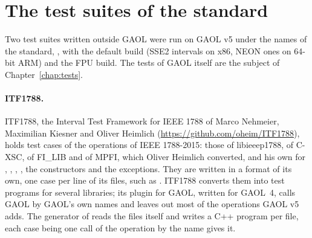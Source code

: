 \documentclass[12pt,a4paper,twoside,openright]{book}
\begin{document}
\section{The test suites of the standard}
\label{sec:test-suites}
%

Two test suites written outside GAOL were run on GAOL v5 under the names of
the standard, , with the default build (SSE2 intervals
on x86, NEON ones on 64-bit ARM) and the FPU build. The tests of GAOL
itself are the subject of Chapter~\ref{chap:tests}.

\paragraph{ITF1788.}
ITF1788, the Interval Test Framework for IEEE 1788 of Marco Nehmeier,
Maximilian Kiesner and Oliver Heimlich
(\url{https://github.com/oheim/ITF1788}), holds test cases of the
operations of IEEE 1788-2015: those of libieeep1788, of C-XSC, of FI\_LIB
and of MPFI, which Oliver Heimlich converted, and his own for ,
, , , the constructors and the
exceptions. They are written in a format of its own, one case per line of
its  files, such as
. ITF1788 converts them into test
programs for several libraries; its plugin for GAOL, written for GAOL~4,
calls GAOL by GAOL's own names and leaves out most of the operations GAOL
v5 adds. The generator of  reads the
 files itself and writes a C++ program per file, each case being
one call of the operation by the name  gives it.
\end{document}
